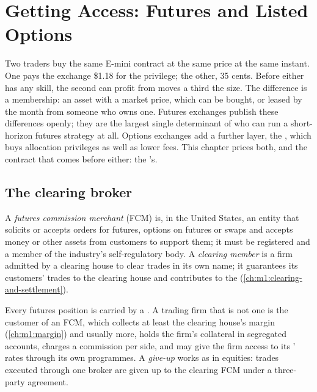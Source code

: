 \chapter{Getting Access: Futures and Listed Options}\label{ch:m1:getting-access-futures-options}

Two traders buy the same E-mini contract at the same price at the same
instant. One pays the exchange \$1.18 for the privilege; the other, 35 cents.
Before either has any skill, the second can profit from moves a third the
size. The difference is a membership: an asset with a market price, which
can be bought, or leased by the month from someone who owns one. Futures
exchanges publish these differences openly; they are the largest single
determinant of who can run a short-horizon futures strategy at all. Options
exchanges add a further layer, the , which buys
allocation privileges as well as lower fees. This chapter prices both, and
the contract that comes before either: the 's.

\section{The clearing broker}

\begin{definition}\label{def:m1:getting-access-futures-options:fcm}
A \emph{futures commission merchant} (FCM)
is, in the United States, an entity that solicits or accepts orders for
futures, options on futures or swaps and accepts money or other assets from
customers to support them; it must be registered and a member of the
industry's self-regulatory body. A \emph{clearing member} is a firm admitted by a clearing house to clear trades in its own
name; it guarantees its customers' trades to the clearing house and
contributes to the  (\cref{ch:m1:clearing-and-settlement}).
\end{definition}

Every futures position is carried by a . A trading firm that
is not one is the customer of an FCM, which collects at least the clearing
house's margin (\cref{ch:m1:margin}) and usually more, holds the firm's
collateral in segregated accounts, charges a commission per side, and may
give the firm access to its ' rates through its own
programmes. A \emph{give-up} works as in equities: trades
executed through one broker are given up to the clearing FCM under a
three-party agreement.

